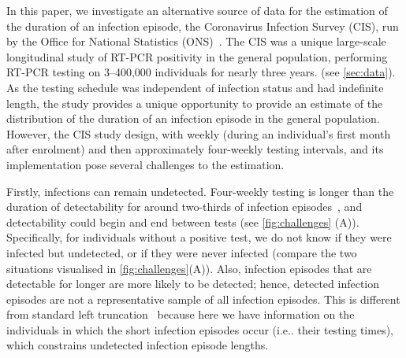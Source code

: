\documentclass[12pt]{article}
\makeatletter
\DeclareRobustCommand\onedot{\futurelet\@let@token\@onedot}
\def\@onedot{\ifx\@let@token.\else.\null\fi\xspace}
\def\eg{e.g\onedot} \def\Eg{{E.g}\onedot}
\def\ie{i.e\onedot} \def\Ie{{I.e}\onedot}
\makeatother
\begin{document}

In this paper, we investigate an alternative source of data for the estimation of the duration of an infection episode, the Coronavirus Infection Survey (CIS), run by the Office for National Statistics (ONS)~\citep{CIS}.
The CIS was a unique large-scale longitudinal study of RT-PCR positivity in the general population, performing RT-PCR testing on 3--400,000 individuals for nearly three years. (see \cref{sec:data}).
As the testing schedule was independent of infection status and had indefinite length, the study provides a unique opportunity to provide an estimate of the distribution of the duration of an infection episode in the general population.
However, the CIS study design, with weekly (during an individual's first month after enrolment) and then approximately four-weekly testing intervals, and its implementation pose several challenges to the estimation.

Firstly, infections can remain undetected.
Four-weekly testing is longer than the duration of detectability for around two-thirds of infection episodes~\citep{killingleySafety}, and detectability could begin and end between tests (see \cref{fig:challenges} (A)).
Specifically, for individuals without a positive test, we do not know if they were infected but undetected, or if they were never infected (compare the two situations visualised in \cref{fig:challenges}(A)). Also,
infection episodes that are detectable for longer are more likely to be detected; hence, detected infection episodes are not a representative sample of all infection episodes.
This is different from standard left truncation~\cite[e.g.][]{sunEmpirical,bacchettiNonparametric} because here we have information on the individuals in which the short infection episodes occur (\ie their testing times), which constrains undetected infection episode lengths.
\end{document}
